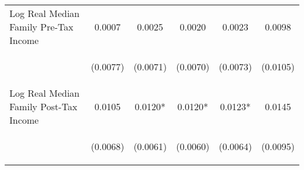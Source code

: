 \begin{center}
\begin{tabular}{lccccc}
\noalign{\smallskip}Log Real Median Family Pre-Tax Income & \begin{scriptsize}0.0007\end{scriptsize} & \begin{scriptsize}0.0025\end{scriptsize} & \begin{scriptsize}0.0020\end{scriptsize} & \begin{scriptsize}0.0023\end{scriptsize} & \begin{scriptsize}0.0098\end{scriptsize}\\
 & \begin{scriptsize}(0.0077)\end{scriptsize} & \begin{scriptsize}(0.0071)\end{scriptsize} & \begin{scriptsize}(0.0070)\end{scriptsize} & \begin{scriptsize}(0.0073)\end{scriptsize} & \begin{scriptsize}(0.0105)\end{scriptsize}\\
\noalign{\smallskip}Log Real Median Family Post-Tax Income & \begin{scriptsize}0.0105\end{scriptsize} & \begin{scriptsize}0.0120*\end{scriptsize} & \begin{scriptsize}0.0120*\end{scriptsize} & \begin{scriptsize}0.0123*\end{scriptsize} & \begin{scriptsize}0.0145\end{scriptsize}\\
 & \begin{scriptsize}(0.0068)\end{scriptsize} & \begin{scriptsize}(0.0061)\end{scriptsize} & \begin{scriptsize}(0.0060)\end{scriptsize} & \begin{scriptsize}(0.0064)\end{scriptsize} & \begin{scriptsize}(0.0095)\end{scriptsize}\\

\end{tabular}
\end{center}
